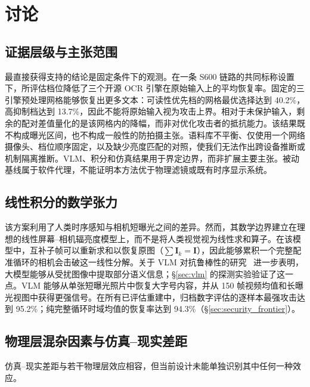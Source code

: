 
\section{讨论}
\label{sec:discussion}

\subsection{证据层级与主张范围}

最直接获得支持的结论是固定条件下的观测。在一条 S600 链路的共同标称设置下，所评估档位降低了三个开源 OCR 引擎在原始输入上的平均恢复率。固定的三引擎预处理网格能够恢复出更多文本：可读性优先档的网格最优选择达到 40.2\%，高抑制档达到 13.7\%，因此不能将原始输入视为攻击上界。相对于未保护输入，剩余的配对差值量化的是该网格内的降幅，而非对优化攻击者的抵抗能力。该结果既不构成曝光区间，也不构成一般性的防拍摄主张。语料库不平衡、仅使用一个网络摄像头、档位顺序固定，以及缺少亮度匹配的对照，使我们无法作出跨设备推断或机制隔离推断。VLM、积分和仿真结果用于界定边界，而非扩展主要主张。被动基线属于软件代理，不能证明本方法优于物理滤镜或既有时序显示系统。

\subsection{线性积分的数学张力}

该方案利用了人类时序感知与相机短曝光之间的差异。然而，其数学边界建立在理想的线性屏幕--相机辐亮度模型上，而不是将人类视觉视为线性求和算子。在该模型中，互补子帧可以重新求和以恢复原图（$\sum\mathbf{I}_k = \mathbf{I}$），因此能够累积一个完整配准循环的相机会击破这一线性分解。关于 VLM 对抗鲁棒性的研究~\cite{b_jiang2025} 进一步表明，大模型能够从受扰图像中提取部分语义信息；\S\ref{sec:vlm} 的探测实验验证了这一点。VLM 能够从单张短曝光照片中恢复大字号内容，并从 150 帧视频均值和长曝光视图中获得更强信号。在所有已评估重建中，归档数字评估的逐样本最强攻击达到 95.2\%；纯完整循环时域均值的恢复率达到 94.3\%（\S\ref{sec:security_frontier}）。

\subsection{物理层混杂因素与仿真--现实差距}

仿真--现实差距与若干物理层效应相容，但当前设计未能单独识别其中任何一种效应。

